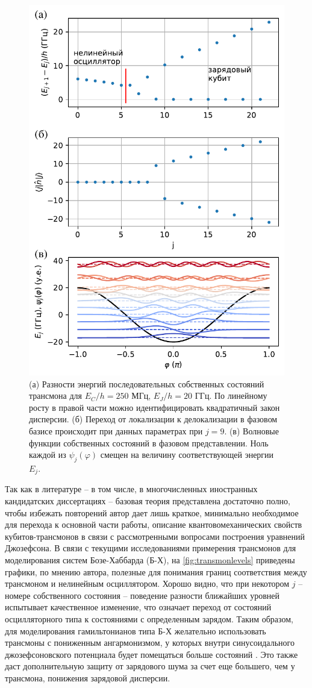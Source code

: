 \documentclass[14pt, a4paper]{extarticle}
\begin{document}
\begin{figure}[t]
	\centering
	\includegraphics[width=0.6\linewidth]{Pictures/transmon_levels}
	\caption{(а) Разности энергий последовательных собственных состояний трансмона для $E_C/h = 250$ МГц, $E_J/h = 20$ ГГц. По линейному росту в правой части можно идентифицировать квадратичный закон дисперсии. (б) Переход от локализации к делокализации в фазовом базисе происходит при данных параметрах при $j=9$. (в) Волновые функции собственных состояний в фазовом представлении. Ноль каждой из $\psi_j(\varphi)$ смещен на величину соответствующей энергии $E_j$.}
	\label{fig:transmonlevels}
\end{figure}

Так как в литературе -- в том числе, в многочисленных иностранных кандидатских диссертациях -- базовая теория представлена достаточно полно, чтобы избежать повторений автор дает лишь краткое, минимально необходимое для перехода к основной части работы, описание квантовомеханических свойств кубитов-трансмонов в связи с рассмотренными вопросами построения уравнений Джозефсона. В связи с текущими исследованиями примерения трансмонов для моделирования систем Бозе-Хаббарда (Б-Х), на \autoref{fig:transmonlevels} приведены графики, по мнению автора, полезные для понимания границ соответствия между трансмоном и нелинейным осциллятором. Хорошо видно, что при некотором $j$ -- номере собственного состояния -- поведение разности ближайших уровней испытывает качественное изменение, что означает переход от состояний осцилляторного типа к состояниями с определенным зарядом. Таким образом, для моделирования гамильтонианов типа Б-Х желательно использовать трансмоны с пониженным ангармонизмом, у которых внутри синусоидального джозефсоновского потенциала будет помещаться больше состояний \cite{winkel2020implementation}. Это также даст дополнительную защиту от зарядового шума за счет еще большего, чем у трансмона, понижения зарядовой дисперсии.
\end{document}
